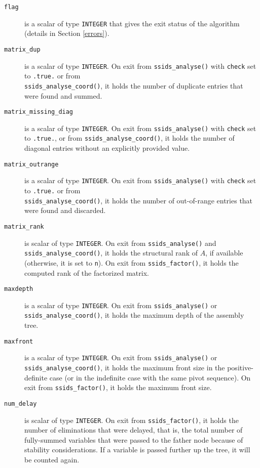 \begin{description}

\item[\texttt{flag}] is a scalar of type  {\tt INTEGER}
that gives the exit status of the algorithm (details in Section \ref{errors}).

\item[\texttt{matrix\_dup}] is a scalar  of type  {\tt INTEGER}.
On exit from {\tt ssids\_analyse()}
with {\tt check} set to {\tt .true.} or from \\
{\tt ssids\_analyse\_coord()}, it holds the
number of duplicate entries that were found and summed.

\item[\texttt{matrix\_missing\_diag}] is a scalar of type {\tt INTEGER}.
On exit from {\tt ssids\_analyse()} with {\tt check} set to {\tt .true.},
or from {\tt ssids\_analyse\_coord()}, it holds the number of diagonal
entries without an explicitly provided value.

\item[\texttt{matrix\_outrange}] is a scalar  of type  {\tt INTEGER}.
On exit from {\tt ssids\_analyse()}
with {\tt check} set to {\tt .true.} or from \\
{\tt ssids\_analyse\_coord()}, it holds the
number of out-of-range entries that were   found and discarded.

\item[\texttt{matrix\_rank}] is scalar of type  {\tt INTEGER}. On exit from
{\tt ssids\_analyse()} and {\tt ssids\_analyse\_coord()}, it holds
the structural rank of $A$, if available (otherwise, it is set to {\tt n}).
On exit from
{\tt ssids\_factor()}, it holds the computed rank of
the factorized matrix.

\item[\texttt{maxdepth}] is a scalar of type  {\tt INTEGER}. On exit from
{\tt ssids\_analyse()} or {\tt ssids\_analyse\_coord()}, it holds the maximum depth of the assembly tree.

\item[\texttt{maxfront}] is a scalar of type  {\tt INTEGER}. On exit from
{\tt ssids\_analyse()} or {\tt ssids\_analyse\_coord()}, it holds the maximum front size
in the positive-definite case (or in the indefinite case with
the same pivot sequence). On exit from
{\tt ssids\_factor()}, it holds the maximum front size.

\item[\texttt{num\_delay}] is scalar of type  {\tt INTEGER}. On exit from
{\tt ssids\_factor()}, it holds the
number of eliminations that were
delayed, that is, the total number of fully-summed
variables that were passed to the father node because
of stability considerations. If a variable is passed
further up the tree, it will be counted again.


\end{description}
